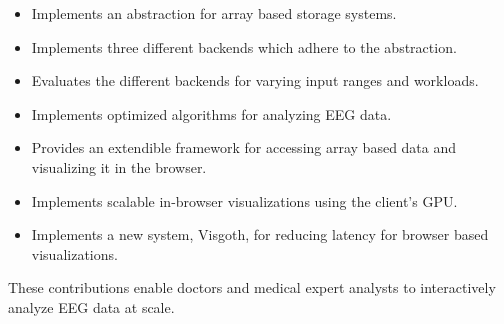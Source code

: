 \begin{itemize}

  \item Implements an abstraction for array based storage systems.

  \item Implements three different backends which adhere to the abstraction.

  \item Evaluates the different backends for varying input ranges and
    workloads.

  \item Implements optimized algorithms for analyzing EEG data.

  \item Provides an extendible framework for accessing array based data and
    visualizing it in the browser.

  \item Implements scalable in-browser visualizations using the client's GPU.

  \item Implements a new system, Visgoth, for reducing latency for browser
    based visualizations.

\end{itemize}

These contributions enable doctors and medical expert analysts to interactively
analyze EEG data at scale.

